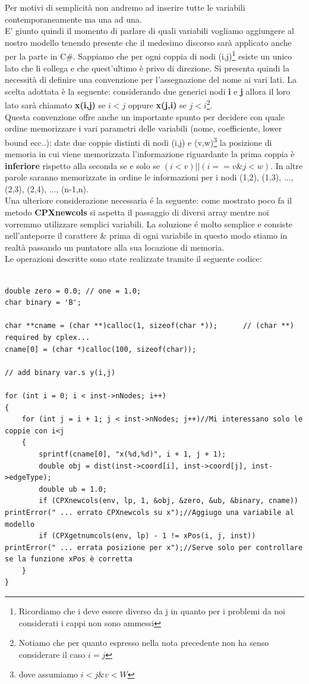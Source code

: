\documentclass[11pt]{article}
\begin{document}
Per motivi di semplicità non andremo ad inserire tutte le variabili contemporaneamente ma una ad una.\\

E' giunto quindi il momento di parlare di quali variabili vogliamo aggiungere al nostro modello tenendo presente che il medesimo discorso sarà applicato anche per la parte in C\#. Sappiamo che per ogni coppia di nodi (i,j)\footnote{Ricordiamo che i deve essere diverso da j in quanto per i problemi da noi considerati i cappi non sono ammessi} esiste un unico lato che li collega e che quest'ultimo è privo di direzione. Si presenta quindi la necessità di definire una convenzione per l'assegnazione del nome ai vari lati. La scelta adottata è la seguente: considerando due generici nodi \textbf{i} e \textbf{j} allora il loro lato sarà chiamato \textbf{x(i,j)} se $i<j$ oppure \textbf{x(j,i)} se $j<i$\footnote{Notiamo che per quanto espresso nella nota precedente non ha senso considerare il caso $i=j$}.\\
Questa convenzione offre anche un importante spunto per decidere con quale ordine memorizzare i vari parametri delle variabili (nome, coefficiente, lower bound ecc..): date due coppie distinti di nodi (i,j) e (v,w)\footnote{dove assumiamo $i<j \& v<W$} la posizione di memoria in cui viene memorizzata l'informazione riguardante la prima coppia è \textbf{inferiore} rispetto alla seconda se e solo se $(i<v) || (i==v \& j<w)$. In altre parole saranno memorizzate in ordine le informazioni per i nodi (1,2), (1,3), ..., (2,3), (2,4), ..., (n-1,n).\\
Una ulteriore considerazione necessaria \'e la seguente: come mostrato poco fa il metodo \textbf{CPXnewcols} si aspetta il passaggio di diversi array mentre noi vorremmo utilizzare semplici variabili. La soluzione \'e molto semplice e consiste nell'anteporre il carattere \& prima di ogni variabile in questo modo stiamo in realtà passando un puntatore alla sua locazione di memoria.\\

Le operazioni descritte sono state realizzate tramite il seguente codice:

\begin{lstlisting}

double zero = 0.0; // one = 1.0; 	
char binary = 'B';

char **cname = (char **)calloc(1, sizeof(char *));		// (char **) required by cplex...
cname[0] = (char *)calloc(100, sizeof(char));

// add binary var.s y(i,j)      

for (int i = 0; i < inst->nNodes; i++)
{
	for (int j = i + 1; j < inst->nNodes; j++)//Mi interessano solo le coppie con i<j
	{
		sprintf(cname[0], "x(%d,%d)", i + 1, j + 1);
		double obj = dist(inst->coord[i], inst->coord[j], inst->edgeType);
		double ub = 1.0;
		if (CPXnewcols(env, lp, 1, &obj, &zero, &ub, &binary, cname)) printError(" ... errato CPXnewcols su x");//Aggiugo una variabile al modello
		if (CPXgetnumcols(env, lp) - 1 != xPos(i, j, inst)) printError(" ... errata posizione per x");//Serve solo per controllare se la funzione xPos è corretta
	}
}

\end{lstlisting}
\end{document}
